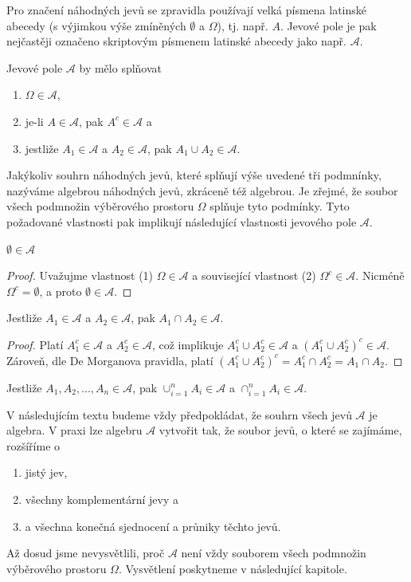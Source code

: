 Pro značení náhodných jevů se zpravidla používají velká písmena latinské abecedy (s výjimkou výše zmíněných $\emptyset$ a $\Omega$), tj. např. $A$. Jevové pole je pak nejčastěji označeno skriptovým písmenem latinské abecedy jako např. $\mathscr{A}$.

Jevové pole $\mathscr{A}$ by mělo splňovat
\begin{enumerate}
\item $\Omega \in \mathscr{A}$,
\item je-li $A \in \mathscr{A}$, pak $A^c \in \mathscr{A}$ a
\item jestliže $A_1 \in \mathscr{A}$ a $A_2 \in \mathscr{A}$, pak $A_1 \cup A_2 \in \mathscr{A}$.
\end{enumerate}
Jakýkoliv souhrn náhodných jevů, které splňují výše uvedené tři podmnínky, nazýváme algebrou náhodných jevů, zkráceně též algebrou. Je zřejmé, že soubor všech podmnožin výběrového prostoru $\Omega$ splňuje tyto podmínky. Tyto požadované vlastnosti pak implikují následující vlastnosti jevového pole $\mathscr{A}$.

\begin{theorem}
$\emptyset \in \mathscr{A}$
\end{theorem}
\begin{proof}
Uvažujme vlastnost (1) $\Omega \in \mathscr{A}$ a související vlastnost (2) $\Omega^c \in \mathscr{A}$. Nicméně $\Omega^c = \emptyset$, a proto $\emptyset \in \mathscr{A}$.
\end{proof}
\begin{theorem}
Jestliže $A_1 \in \mathscr{A}$ a $A_2 \in \mathscr{A}$, pak $A_1 \cap A_2 \in \mathscr{A}$.
\end{theorem}
\begin{proof}
Platí $A_1^c \in \mathscr{A}$ a $A_2^c \in \mathscr{A}$, což implikuje $A_1^c \cup A_2^c \in \mathscr{A}$ a $(A_1^c \cup A_2^c)^c \in \mathscr{A}$. Zároveň, dle De Morganova pravidla, platí $(A_1^c \cup A_2^c)^c = A_1^c \cap A_2^c = A_1 \cap A_2$.
\end{proof}
\begin{theorem}
Jestliže $A_1, A_2, ..., A_n \in \mathscr{A}$, pak $\cup^{n}_{i=1}A_i \in \mathscr{A}$ a $\cap^{n}_{i=1}A_i \in \mathscr{A}$.
\end{theorem}
V následujícím textu budeme vždy předpokládat, že souhrn všech jevů $\mathscr{A}$ je algebra. V praxi lze algebru $\mathscr{A}$ vytvořit tak, že soubor jevů, o které se zajímáme, rozšíříme o
\begin{enumerate}
\item jistý jev,
\item všechny komplementární jevy a
\item a všechna konečná sjednocení a průniky těchto jevů.
\end{enumerate}
Až dosud jsme nevysvětlili, proč $\mathscr{A}$ není vždy souborem všech podmnožin výběrového prostoru $\Omega$. Vysvětlení poskytneme v následující kapitole.

